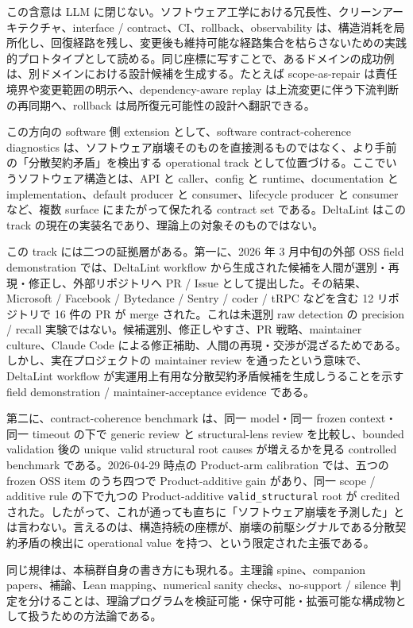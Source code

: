 \documentclass[12pt,a4paper]{article}
\begin{document}
この含意は LLM に閉じない。ソフトウェア工学における冗長性、クリーンアーキテクチャ、interface / contract、CI、rollback、observability は、構造消耗を局所化し、回復経路を残し、変更後も維持可能な経路集合を枯らさないための実践的プロトタイプとして読める。同じ座標に写すことで、あるドメインの成功例は、別ドメインにおける設計候補を生成する。たとえば scope-as-repair は責任境界や変更範囲の明示へ、dependency-aware replay は上流変更に伴う下流判断の再同期へ、rollback は局所復元可能性の設計へ翻訳できる。

この方向の software 側 extension として、software contract-coherence diagnostics は、ソフトウェア崩壊そのものを直接測るものではなく、より手前の「分散契約矛盾」を検出する operational track として位置づける。ここでいうソフトウェア構造とは、API と caller、config と runtime、documentation と implementation、default producer と consumer、lifecycle producer と consumer など、複数 surface にまたがって保たれる contract set である。DeltaLint はこの track の現在の実装名であり、理論上の対象そのものではない。

この track には二つの証拠層がある。第一に、2026 年 3 月中旬の外部 OSS field demonstration では、DeltaLint workflow から生成された候補を人間が選別・再現・修正し、外部リポジトリへ PR / Issue として提出した。その結果、Microsoft / Facebook / Bytedance / Sentry / coder / tRPC などを含む 12 リポジトリで 16 件の PR が merge された。これは未選別 raw detection の precision / recall 実験ではない。候補選別、修正しやすさ、PR 戦略、maintainer culture、Claude Code による修正補助、人間の再現・交渉が混ざるためである。しかし、実在プロジェクトの maintainer review を通ったという意味で、DeltaLint workflow が実運用上有用な分散契約矛盾候補を生成しうることを示す field demonstration / maintainer-acceptance evidence である。

第二に、contract-coherence benchmark は、同一 model・同一 frozen context・同一 timeout の下で generic review と structural-lens review を比較し、bounded validation 後の unique valid structural root causes が増えるかを見る controlled benchmark である。2026-04-29 時点の Product-arm calibration では、五つの frozen OSS item のうち四つで Product-additive gain があり、同一 scope / additive rule の下で九つの Product-additive \texttt{valid\_structural} root が credited された。したがって、これが通っても直ちに「ソフトウェア崩壊を予測した」とは言わない。言えるのは、構造持続の座標が、崩壊の前駆シグナルである分散契約矛盾の検出に operational value を持つ、という限定された主張である。

同じ規律は、本稿群自身の書き方にも現れる。主理論 spine、companion papers、補論、Lean mapping、numerical sanity checks、no-support / silence 判定を分けることは、理論プログラムを検証可能・保守可能・拡張可能な構成物として扱うための方法論である。
\end{document}
